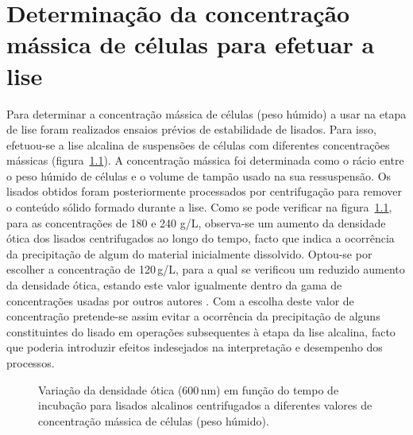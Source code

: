 \chapter{Determinação da concentração mássica de células para efetuar a lise}
\label{app:1}
Para determinar a concentração mássica de células (peso húmido) a usar na etapa de lise foram realizados ensaios prévios de estabilidade de lisados. Para isso, efetuou-se a lise alcalina de suspensões de células com diferentes concentrações mássicas (figura~\ref{fig:estabilidade_lisados}). A concentração mássica foi determinada como o rácio entre o peso húmido de células e o volume de tampão usado na sua ressuspensão. Os lisados obtidos foram posteriormente processados por centrifugação para remover o conteúdo sólido formado durante a lise. Como se pode verificar na figura~\ref{fig:estabilidade_lisados}, para as concentrações de 180 e 240 g/L, observa-se um aumento da densidade ótica dos lisados centrifugados ao longo do tempo, facto que indica a ocorrência da precipitação de algum do material inicialmente dissolvido. Optou-se por escolher a concentração de 120\,g/L, para a qual se verificou um reduzido aumento da densidade ótica, estando este valor igualmente dentro da gama de concentrações usadas por outros autores \cite{theo,chamsart,urthaler}. Com a escolha deste valor de concentração pretende-se assim evitar a ocorrência da precipitação de alguns constituintes do lisado em operações subsequentes à etapa da lise alcalina, facto que poderia introduzir efeitos indesejados na interpretação e desempenho dos processos.
\begin{figure}[!h]
    \centering
    
    \caption[Densidade ótica de lisados em função do tempo de incubação]{Variação da densidade ótica (600\,nm) em função do tempo de incubação para lisados alcalinos centrifugados a diferentes valores de concentração mássica de células (peso húmido).}
    \label{fig:estabilidade_lisados}
\end{figure}

